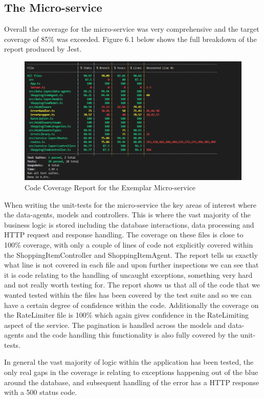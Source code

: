 \subsection{The Micro-service}
Overall the coverage for the micro-service was very comprehensive and the target coverage of 85\% was exceeded. Figure 6.1 below shows the full breakdown of the report produced by Jest.
\begin{figure}[!htb]
\caption{Code Coverage Report for the Exemplar Micro-service}
\centering
\includegraphics[scale=0.62]{FYP_Dissertation_template/Figures/microservice-code-coverage.PNG}
\end{figure}
\FloatBarrier
When writing the unit-tests for the micro-service the key areas of interest where the data-agents, models and controllers. This is where the vast majority of the business logic is stored including the database interactions, data processing and HTTP request and response handling. The coverage on these files is close to 100\% coverage, with only a couple of lines of code not explicitly covered within the ShoppingItemController and ShoppingItemAgent. The report tells us exactly what line is not covered in each file and upon further inspections we can see that it is code relating to the handling of uncaught exceptions, something very hard and not really worth testing for. The report shows us that all of the code that we wanted tested within the files has been covered by the test suite and so we can have a certain degree of confidence within the code. Additionally the coverage on the RateLimiter file is 100\% which again gives confidence in the RateLimiting aspect of the service. The pagination is handled across the models and data-agents and the code handling this functionality is also fully covered by the unit-tests.

In general the vast majority of logic within the application has been tested, the only real gaps in the coverage is relating to exceptions happening out of the blue around the database, and subsequent handling of the error has a HTTP response with a 500 status code.

